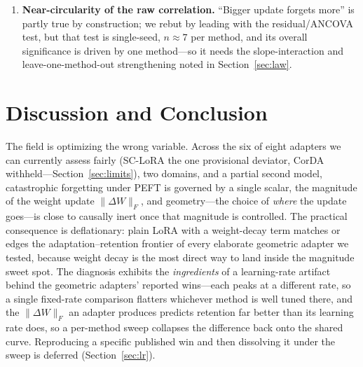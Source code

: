 \documentclass[11pt]{article}
\newcommand{\dw}{\lVert\Delta W\rVert_F}
\begin{document}
\begin{enumerate}
        retention and per-benchmark slopes are not yet normalizable, and ``TruthfulQA
        immunity'' needs verification against a floor artifact.
  \item \textbf{Near-circularity of the raw correlation.} ``Bigger update forgets more''
        is partly true by construction; we rebut by leading with the residual/ANCOVA test,
        but that test is single-seed, $n\!\approx\!7$ per method, and its overall
        significance is driven by one method---so it needs the slope-interaction and
        leave-one-method-out strengthening noted in Section~\ref{sec:law}.
\end{enumerate}

\section{Discussion and Conclusion}\label{sec:conclusion}
The field is optimizing the wrong variable. Across the six of eight adapters we can
currently assess fairly (SC-LoRA the one provisional deviator, CorDA
withheld---Section~\ref{sec:limits}), two domains, and a partial second model,
catastrophic forgetting under PEFT is governed by a single scalar,
the magnitude of the weight update $\dw$, and geometry---the choice of \emph{where} the
update goes---is close to causally inert once that magnitude is controlled. The practical
consequence is deflationary: plain LoRA with a weight-decay term matches or edges the
adaptation--retention frontier of every elaborate geometric adapter we tested, because
weight decay is the most direct way to land inside the magnitude sweet spot. The
diagnosis exhibits the \emph{ingredients} of a learning-rate artifact behind the
geometric adapters' reported wins---each peaks at a different rate, so a single
fixed-rate comparison flatters whichever method is well tuned there, and the $\dw$ an
adapter produces predicts retention far better than its learning rate does, so a
per-method sweep collapses the difference back onto the shared curve. Reproducing a
specific published win and then dissolving it under the sweep is deferred
(Section~\ref{sec:lr}).
\end{document}
